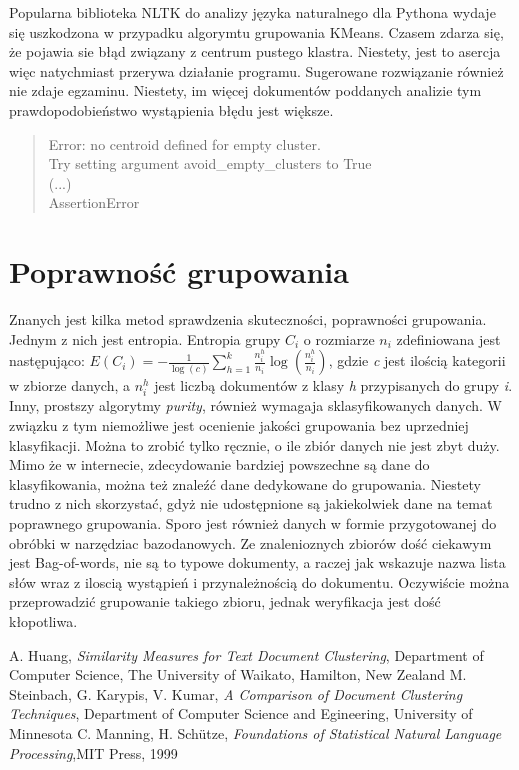 \documentclass{article}
\begin{document}
Popularna biblioteka NLTK do analizy języka naturalnego dla Pythona wydaje się uszkodzona w przypadku algorymtu grupowania KMeans. Czasem zdarza się, że pojawia sie błąd związany z centrum pustego klastra. Niestety, jest to asercja więc natychmiast przerywa działanie programu. Sugerowane rozwiązanie również nie zdaje egzaminu. Niestety, im więcej dokumentów poddanych analizie tym prawdopodobieństwo wystąpienia błędu jest większe.
\begin{quotation}
Error: no centroid defined for empty cluster. \\
Try setting argument avoid\_empty\_clusters to True \\
(...) \\
AssertionError
\end{quotation}

\section{Poprawność grupowania}
Znanych jest kilka metod sprawdzenia skuteczności, poprawności grupowania. Jednym z nich jest entropia. Entropia grupy \( C_{i} \) o rozmiarze \( n_{i} \) zdefiniowana jest następująco:
\( E(C_{i}) = -\frac{1}{\log(c)}\sum_{h=1}^{k}\frac{n_i^h}{n_i}\log(\frac{n_i^h}{n_i}) \), gdzie \emph{c} jest ilością kategorii w zbiorze danych, a \( n_i^h  \) jest liczbą dokumentów z klasy \emph{h} przypisanych do grupy \emph{i}. Inny, prostszy algorytmy \emph{purity}, również wymagaja sklasyfikowanych danych. W związku z tym niemożliwe jest ocenienie jakości grupowania bez uprzedniej klasyfikacji. Można to zrobić tylko ręcznie, o ile zbiór danych nie jest zbyt duży.
Mimo że w internecie, zdecydowanie bardziej powszechne są dane do klasyfikowania, można też znaleźć dane dedykowane do grupowania. Niestety trudno z nich skorzystać, gdyż nie udostępnione są jakiekolwiek dane na temat poprawnego grupowania. Sporo jest również danych w formie przygotowanej do obróbki w narzędziac bazodanowych. 
Ze znalenioznych zbiorów dość ciekawym jest Bag-of-words, nie są to typowe dokumenty, a raczej jak wskazuje nazwa lista słów wraz z iloscią wystąpień i przynależnością do dokumentu. Oczywiście można przeprowadzić grupowanie takiego zbioru, jednak weryfikacja jest dość kłopotliwa.

\begin{thebibliography}{9}
A. Huang, \emph{Similarity Measures for Text Document Clustering}, Department of Computer Science, The University of Waikato, Hamilton, New Zealand
M. Steinbach, G. Karypis, V. Kumar, \emph{A Comparison of Document Clustering Techniques}, Department of Computer Science and Egineering, University of Minnesota
C. Manning, H. Schütze, \emph{Foundations of Statistical Natural Language Processing},MIT Press, 1999
\end{thebibliography}
\end{document}
